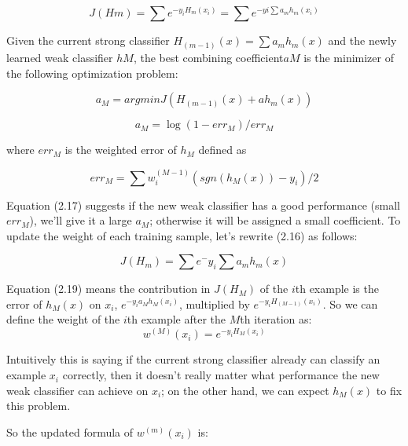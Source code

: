 \documentclass[12pt, twoside]{report}
\begin{document}
	\begin{equation}
	J(Hm)=\sum  e^{-y_iH_m(x_i)} =\sum e^{-yi \sum a_m h_m(x_i)} 
	\end{equation}
	
	Given the current strong classifier $H_(m-1)(x)=\sum a_m h_m (x)$ and the newly learned
	weak classifier $hM$, the best combining coefficient$ aM$ is the minimizer of the following
	optimization problem:
	
	\begin{equation}
	a_M = argminJ(H_(m-1)(x)+ah_m(x))
	\end{equation}
	
	\begin{equation}
	a_M=\log (1-err_M ) /err_M  
	\end{equation}
	
	where $err_M$ is the weighted error of $h_M$ defined as
	
	\begin{equation}
	err_M=\sum w_i^(M-1)(sgn(h_M(x))-y_i)/2
	\end{equation}
	
	Equation (2.17) suggests if the new weak classifier has a good performance (small $err_M$),
	we’ll give it a large $a_M$; otherwise it will be assigned a small coefficient.
	To update the weight of each training sample, let’s rewrite (2.16) as follows:
	
	\begin{equation}
	J(H_m)=\sum e^-y_i \sum a_m h_m (x)
	\end{equation}
	
	\newpage
	\par
	Equation (2.19) means the contribution in $J(H_M)$ of the $i$th example is the error of $h_M(x)$ on $x_i$, $e^{-y_ia_Mh_M(x_i)}$, multiplied by $e^{-y_iH_{(M-1)}(x_i)}$. So we can define the weight of the $i$th example after the $M$th iteration as:
	\begin{equation}
		w^{(M)}(x_i) = e^{-y_iH_M(x_i)}
	\end{equation}

	\par
	Intuitively this is saying if the current strong classifier already can classify an example $x_i$ correctly, then it doesn’t really matter what performance the new weak classifier can achieve on $x_i$; on the other hand, we can expect $h_M(x)$ to fix this problem.

	\par	
	So the updated formula of $w^{(m)}(x_i)$ is:
\end{document}
